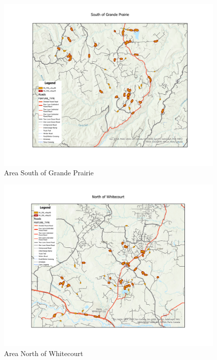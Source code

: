 \documentclass[
]{article}
\begin{document}
\begin{figure}

{\centering \includegraphics[width=0.8\linewidth]{../graphics/South-of-Grande-Prairie} 

}

\caption{Area South of Grande Prairie}\label{fig:GP}
\end{figure}
\begin{figure}

{\centering \includegraphics[width=0.8\linewidth]{../graphics/North-of-Whitecourt} 

}

\caption{Area North of Whitecourt}\label{fig:WC}
\end{figure}
\end{document}

